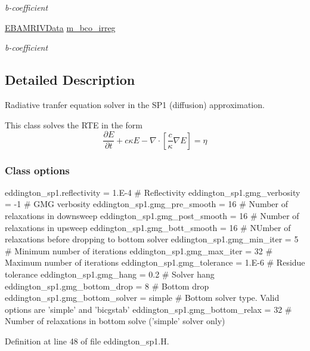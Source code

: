 \begin{DoxyCompactItemize}
\begin{DoxyCompactList}\small\item\em b-\/coefficient \end{DoxyCompactList}\item 
\hyperlink{type__definitions_8H_a6b8fa905d55cbb491b52180386f0e0c1}{E\+B\+A\+M\+R\+I\+V\+Data} \hyperlink{classeddington__sp1_a992bfd5da0891c001cf63619230d96d1}{m\+\_\+bco\+\_\+irreg}
\begin{DoxyCompactList}\small\item\em b-\/coefficient \end{DoxyCompactList}\end{DoxyCompactItemize}


\subsection{Detailed Description}
Radiative tranfer equation solver in the S\+P1 (diffusion) approximation. 

This class solves the R\+TE in the form \[ \frac{\partial E}{\partial t} + c\kappa E - \nabla\cdot\left[\frac{c}{\kappa}\nabla E\right] = \eta \]

\subsubsection*{Class options }

\begin{DoxyVerb}eddington_sp1.reflectivity      = 1.E-4     # Reflectivity
eddington_sp1.gmg_verbosity     = -1        # GMG verbosity
eddington_sp1.gmg_pre_smooth    = 16        # Number of relaxations in downsweep
eddington_sp1.gmg_post_smooth   = 16        # Number of relaxations in upsweep
eddington_sp1.gmg_bott_smooth   = 16        # NUmber of relaxations before dropping to bottom solver
eddington_sp1.gmg_min_iter      = 5         # Minimum number of iterations
eddington_sp1.gmg_max_iter      = 32        # Maximum number of iterations
eddington_sp1.gmg_tolerance     = 1.E-6     # Residue tolerance
eddington_sp1.gmg_hang          = 0.2       # Solver hang
eddington_sp1.gmg_bottom_drop   = 8         # Bottom drop
eddington_sp1.gmg_bottom_solver = simple    # Bottom solver type. Valid options are 'simple' and 'bicgstab'
eddington_sp1.gmg_bottom_relax  = 32        # Number of relaxations in bottom solve ('simple' solver only)\end{DoxyVerb}
 

Definition at line 48 of file eddington\+\_\+sp1.\+H.



